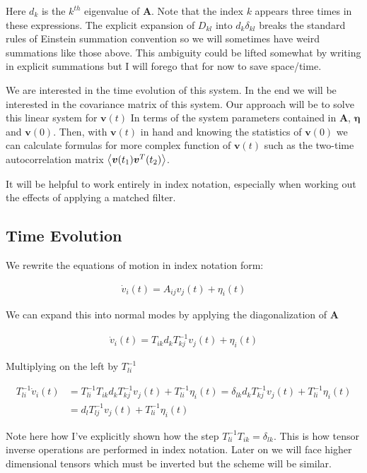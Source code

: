 \documentclass[12pt]{article}
\newcommand{\bv}[1]{\boldsymbol{#1}}
\begin{document}
Here $d_k$ is the $k^{th}$ eigenvalue of $\bv{A}$. Note that the index $k$ appears three times in these expressions. The explicit expansion of $D_{kl}$ into $d_k \delta_{kl}$ breaks the standard rules of Einstein summation convention so we will sometimes have weird summations like those above. This ambiguity could be lifted somewhat by writing in explicit summations but I will forego that for now to save space/time.

We are interested in the time evolution of this system. In the end we will be interested in the covariance matrix of this system. Our approach will be to solve this linear system for $\bv{v}(t)$ In terms of the system parameters contained in $\bv{A}$, $\bv{\eta}$ and $\bv{v}(0)$. Then, with $\bv{v}(t)$ in hand and knowing the statistics of $\bv{v}(0)$ we can calculate formulas for more complex function of $\bv{v}(t)$ such as the two-time autocorrelation matrix $\Braket{\bv{v}(t_1)\bv{v}^T(t_2)}$.

It will be helpful to work entirely in index notation, especially when working out the effects of applying a matched filter.

\subsection{Time Evolution}
We rewrite the equations of motion in index notation form:

\begin{align}
\dot{v}_i(t) = A_{ij}v_j(t) + \eta_i(t)
\end{align}

We can expand this into normal modes by applying the diagonalization of $\bv{A}$

\begin{align}
\dot{v}_i(t) = T_{ik}d_k T^{-1}_{kj} v_j(t) + \eta_i(t)
\end{align}

Multiplying on the left by $T^{-1}_{li}$

\begin{align}
T^{-1}_{li} \dot{v}_i(t) &= T^{-1}_{li}T_{ik} d_k T^{-1}_{kj} v_j(t) + T^{-1}_{li}\eta_i(t) = \delta_{lk} d_k T^{-1}_{kj} v_j(t) + T^{-1}_{li}\eta_i(t)\\
&= d_l T^{-1}_{lj}v_j(t) + T^{-1}_{li}\eta_i(t)
\end{align}

Note here how I've explicitly shown how the step $T^{-1}_{li}T_{ik} = \delta_{lk}$. This is how tensor inverse operations are performed in index notation. Later on we will face higher dimensional tensors which must be inverted but the scheme will be similar.
\end{document}
